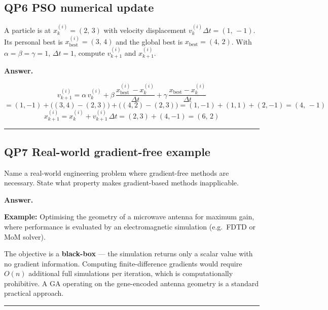\documentclass[11pt,a4paper]{article}
\newcommand{\Q}[2]{\subsection*{Q#1 \quad #2}}
\newenvironment{answer}{\medskip\textbf{Answer.}\par}{\bigskip\hrule\bigskip}
\begin{document}

\Q{P6}{[3 marks] PSO numerical update}
A particle is at $x^{(i)}_k = (2,\,3)$ with velocity displacement
$v^{(i)}_k \Delta t = (1,\,-1)$.  Its personal best is
$x^{(i)}_\text{best} = (3,\,4)$ and the global best is
$x_\text{best} = (4,\,2)$.  With $\alpha = \beta = \gamma = 1$,
$\Delta t = 1$, compute $v^{(i)}_{k+1}$ and $x^{(i)}_{k+1}$.

\begin{answer}
\[
  v^{(i)}_{k+1}
    = \alpha\,v^{(i)}_k
    + \beta\,\frac{x^{(i)}_\text{best} - x^{(i)}_k}{\Delta t}
    + \gamma\,\frac{x_\text{best} - x^{(i)}_k}{\Delta t}
\]
\[
  = (1,-1) + \bigl((3,4)-(2,3)\bigr) + \bigl((4,2)-(2,3)\bigr)
  = (1,-1) + (1,1) + (2,-1)
  = (4,\,-1)
\]
\[
  x^{(i)}_{k+1} = x^{(i)}_k + v^{(i)}_{k+1}\,\Delta t
    = (2,3) + (4,-1) = \boxed{(6,\,2)}
\]
\end{answer}


\Q{P7}{[2 marks] Real-world gradient-free example}
Name a real-world engineering problem where gradient-free methods are
necessary.  State what property makes gradient-based methods inapplicable.

\begin{answer}
\textbf{Example:} Optimising the geometry of a microwave antenna for
maximum gain, where performance is evaluated by an electromagnetic
simulation (e.g.\ FDTD or MoM solver).

The objective is a \textbf{black-box} — the simulation returns only a
scalar value with no gradient information.  Computing finite-difference
gradients would require $O(n)$ additional full simulations per iteration,
which is computationally prohibitive.  A GA operating on the gene-encoded
antenna geometry is a standard practical approach.
\end{answer}
\end{document}
